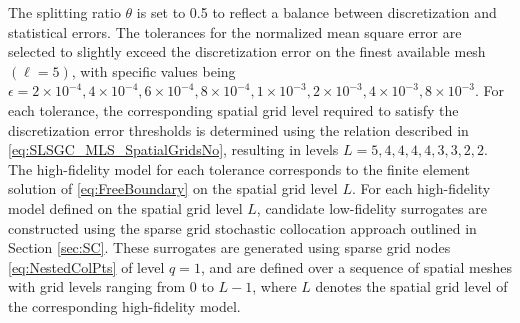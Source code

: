 The splitting ratio $\theta$ is set to 0.5 to reflect a balance between discretization and statistical errors. The tolerances for the normalized mean square error are selected to slightly exceed the discretization error on the finest available mesh $(\ell=5)$, with specific values being $\epsilon=2\times 10^{-4}, 4\times 10^{-4}, 6\times 10^{-4}, 8\times 10^{-4}, 1\times 10^{-3}, 2\times 10^{-3}, 4\times 10^{-3}, 8\times 10^{-3}$. For each tolerance, the corresponding spatial grid level required to satisfy the discretization error thresholds is determined using the relation described in \eqref{eq:SLSGC_MLS_SpatialGridsNo}, resulting in levels $L = 5, 4, 4, 4, 4, 3, 3, 2, 2$. The high-fidelity model for each tolerance corresponds to the finite element solution of \eqref{eq:FreeBoundary} on the spatial grid level $L$. For each high-fidelity model defined on the spatial grid level $L$, candidate low-fidelity surrogates are constructed using the sparse grid stochastic collocation approach outlined in Section \ref{sec:SC}. These surrogates are generated using sparse grid nodes \eqref{eq:NestedColPts} of level $q=1$, and are defined over a sequence of spatial meshes with grid levels ranging from $0$ to $L-1$, where $L$ denotes the spatial grid level of the corresponding high-fidelity model. 

